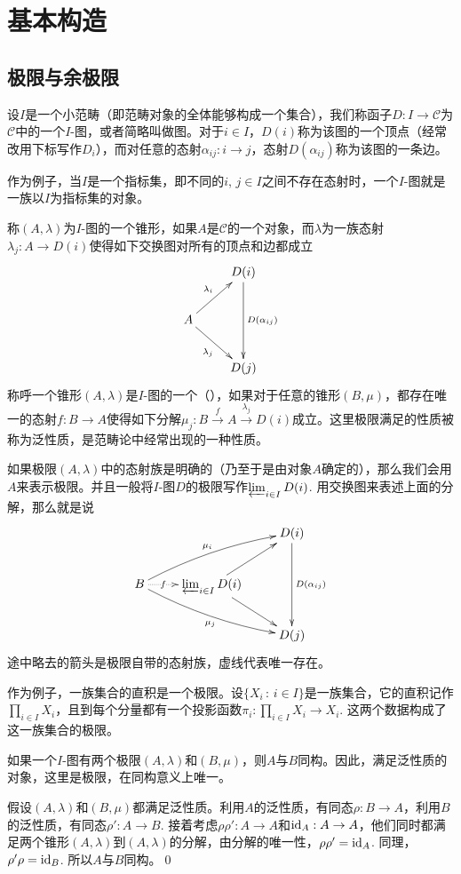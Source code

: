 \chapter{基本构造}

\section{极限与余极限}

\para 设$I$是一个小范畴（即范畴对象的全体能够构成一个集合），我们称函子$D:I\to \mathcal{C}$为$\mathcal{C}$中的一个$I$-图，或者简略叫做图。对于$i\in I$，$D(i)$称为该图的一个顶点（经常改用下标写作$D_i$），而对任意的态射$\alpha_{ij}:i\to j$，态射$D(\alpha_{ij})$称为该图的一条边。

作为例子，当$I$是一个指标集，即不同的$i$, $j\in I$之间不存在态射时，一个$I$-图就是一族以$I$为指标集的对象。

\para 称$(A,\lambda)$为$I$-图的一个{锥形}，如果$A$是$\mathcal{C}$的一个对象，而$\lambda$为一族态射$\lambda_{j}:A\to D(i)$使得如下交换图对所有的顶点和边都成立
\[
	\xymatrix{
		&D(i)\ar[dd]^{D(\alpha_{ij})}\\
		A\ar[ru]^{\lambda_i}\ar[rd]_{\lambda_j}&\\
		&D(j)
	}
\]
称呼一个锥形$(A,\lambda)$是$I$-图的一个（），如果对于任意的锥形$(B,\mu)$，都存在唯一的态射$f:B\to A$使得如下分解$\mu_j:B\xrightarrow{f}A\xrightarrow{\lambda_j}D(i)$成立。这里极限满足的性质被称为泛性质，是范畴论中经常出现的一种性质。

如果极限$(A,\lambda)$中的态射族是明确的（乃至于是由对象$A$确定的），那么我们会用$A$来表示极限。并且一般将$I$-图$D$的极限写作$\varprojlim_{i\in I} D(i)$. 用交换图来表述上面的分解，那么就是说
\[
	\xymatrix{
		&&D(i)\ar[dd]^{D(\alpha_{ij})}\\
		B\ar@{.>}[r]|-{f}\ar@/^/[rru]^-{\mu_i}\ar@/_/[rrd]_{\mu_j}&\varprojlim_{i\in I} D(i)\ar[ru]\ar[rd]&\\
		&&D(j)
	}
\]
途中略去的箭头是极限自带的态射族，虚线代表唯一存在。

作为例子，一族集合的直积是一个极限。设$\{X_i\,:\, i\in I\}$是一族集合，它的直积记作$\prod_{i\in I}X_i$，且到每个分量都有一个投影函数$\pi_i:\prod_{i\in I}X_i\to X_i$. 这两个数据构成了这一族集合的极限。

\pro 如果一个$I$-图有两个极限$(A,\lambda)$和$(B,\mu)$，则$A$与$B$同构。因此，满足泛性质的对象，这里是极限，在同构意义上唯一。

\proof 假设$(A,\lambda)$和$(B,\mu)$都满足泛性质。利用$A$的泛性质，有同态$\rho:B\to A$，利用$B$的泛性质，有同态$\rho':A\to B$. 接着考虑$\rho \rho':A\to A$和$\operatorname{id}_A:A\to A$，他们同时都满足两个锥形$(A,\lambda)$到$(A,\lambda)$的分解，由分解的唯一性，$\rho\rho'=\operatorname{id}_A$. 同理，$\rho'\rho=\operatorname{id}_{B}$. 所以$A$与$B$同构。\qed

